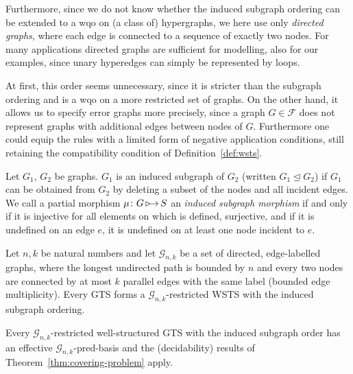 \documentclass{llncs}
\newcommand{\indsubArrow}{\mathop{\textnormal{\texttt{$\triangleright$}}\;\!\!\!\!\to}}
\newcommand{\indsubOrder}{\unlhd}
\begin{document}
Furthermore, since we do not know whether the induced subgraph
ordering can be extended to a wqo on (a class of)
hypergraphs, we here use only \emph{directed graphs}, where each edge
is connected to a sequence of exactly two nodes. For many applications
directed graphs are sufficient for modelling, also for our examples,
since unary hyperedges can simply be represented by loops.

At first, this order seems unnecessary, since it is stricter than the
subgraph ordering and is a wqo on a more restricted set of graphs. On
the other hand, it allows us to specify error graphs more precisely,
since a graph $G \in \mathcal{F}$ does not represent graphs with
additional edges between nodes of $G$. Furthermore one could equip the
rules with a limited form of negative application conditions, still
retaining the compatibility condition of Definition~\ref{def:wsts}.

\begin{definition}
  Let $G_1$, $G_2$ be graphs. $G_1$ is an induced subgraph of $G_2$
  (written $G_1 \indsubOrder G_2$) if $G_1$ can be obtained from $G_2$
  by deleting a subset of the nodes and all incident edges.  We call a
  partial morphism $\mu \colon G \indsubArrow S$ an \emph{induced
    subgraph morphism} if and only if it is injective for all elements
  on which is defined, surjective, and if it is undefined on an edge
  $e$, it is undefined on at least one node incident to $e$.
\end{definition}

\newcommand{\propIndsubgraphWSTS}{ Let $n,k$ be natural numbers and
  let $\mathcal{G}_{n,k}$ be a set of directed, edge-labelled graphs,
  where the longest undirected path is bounded by $n$ and every two nodes are
  connected by at most $k$ parallel edges with the same label (bounded
  edge multiplicity).  Every GTS forms a
  $\mathcal{G}_{n,k}$-restricted WSTS with the induced subgraph
  ordering.}  \newcommand{\propIndsubgraphWSTSTitle}{WSTS wrt.~the
  induced subgraph ordering}
\begin{proposition}[\propIndsubgraphWSTSTitle]
\label{prop:induced-subgraphs-wsts}
\propIndsubgraphWSTS
\end{proposition}


\newcommand{\propIndsubgraphDecidable}{Every $\mathcal{G}_{n,k}$-restricted 
well-structured GTS with the induced subgraph order has an effective 
$\mathcal{G}_{n,k}$-pred-basis and the (decidability) results of 
Theorem~\ref{thm:covering-problem} apply.}
\begin{proposition}\label{prop:induced-subgraph-is-decidable}
\propIndsubgraphDecidable
\end{proposition}
\end{document}
